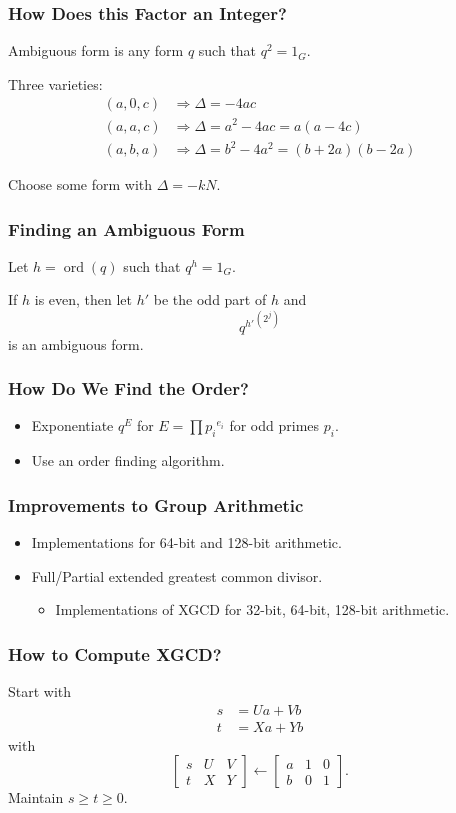 \documentclass{beamer}
\DeclareMathOperator{\ord}{ord}
\newcommand{\matrixThreeTwo}[6]{\left[ \begin{array}{rrr} #1 & #2 & #3 \\ #4 & #5 & #6 \end{array} \right]}
\begin{document}
\begin{frame}
\frametitle{How Does this Factor an Integer?}
Ambiguous form is any form $q$ such that $q^2 = 1_G$.

\bigbreak
Three varieties:
\begin{align*}
(a, 0, c) &\Rightarrow \Delta = -4ac \\
(a, a, c) &\Rightarrow \Delta = a^2 - 4ac = a(a - 4c) \\
(a, b, a) &\Rightarrow \Delta = b^2 - 4a^2 = (b+2a)(b-2a)
\end{align*}

Choose some form with $\Delta = -kN$.
\end{frame}

\begin{frame}
\frametitle{Finding an Ambiguous Form}
Let $h = \ord(q)$ such that $q^h = 1_G$.

\bigbreak
If $h$ is even, then let $h'$ be the odd part of $h$ and
\[
	{q^{h'}}^{\left(2^j\right)}
\]
is an ambiguous form.
\end{frame}

\begin{frame}
\frametitle{How Do We Find the Order?}
\begin{itemize}
\item Exponentiate $q^E$ for $E = \prod {p_i}^{e_i}$ for odd primes $p_i$.
\item Use an order finding algorithm. 
\end{itemize}
\end{frame}



  
\begin{frame}
\frametitle{Improvements to Group Arithmetic}
\begin{itemize}
\item Implementations for 64-bit and 128-bit arithmetic.
\item Full/Partial extended greatest common divisor.
	\begin{itemize}
	\item Implementations of XGCD for 32-bit, 64-bit, 128-bit arithmetic.
	\end{itemize}
\end{itemize}
\end{frame}

\begin{frame}
\frametitle{How to Compute XGCD?}
Start with
\begin{align*}
s &= Ua + Vb \\
t &= Xa + Yb
\end{align*}
with
\[
\matrixThreeTwo{s}{U}{V}{t}{X}{Y} \gets \matrixThreeTwo{a}{1}{0}{b}{0}{1}.
\]
Maintain $s \ge t \ge 0$.
\end{frame}
\end{document}
